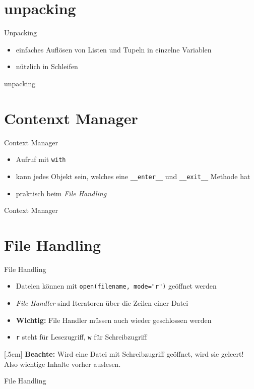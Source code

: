 \section{unpacking}
\begin{frame}{Unpacking}
\begin{itemize}
	\item einfaches Auflösen von Listen und Tupeln in einzelne Variablen
	\item nützlich in  Schleifen
\end{itemize}
\end{frame}
\begin{frame}{unpacking}
	
\end{frame}

\section{Contenxt Manager}
\begin{frame}{Context Manager}
\begin{itemize}
	\item Aufruf mit \texttt{with}
	\item kann jedes Objekt sein, welches eine \texttt{__enter__} und \texttt{__exit__} Methode hat
	\item praktisch beim \textit{File Handling}
\end{itemize}
\end{frame}
\begin{frame}{Context Manager}
	
\end{frame}

\section{File Handling}
\begin{frame}{File Handling}
\begin{itemize}
	\item Dateien können mit \texttt{open(filename, mode="r")} geöffnet werden
	\item \textit{File Handler} sind Iteratoren über die Zeilen einer Datei
	\item \textbf{Wichtig:} File Handler müssen auch wieder geschlossen werden
	\item \texttt{r} steht für Lesezugriff,  \texttt{w} für Schreibzugriff
\end{itemize}[.5cm]
\textbf{Beachte:} Wird eine Datei mit Schreibzugriff geöffnet, wird sie geleert! Also wichtige Inhalte vorher auslesen.
\end{frame}
\begin{frame}{File Handling}
	
\end{frame}


